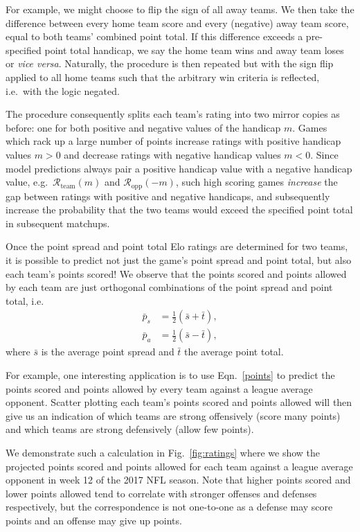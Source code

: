 \documentclass[aps,prc,reprint,amsmath,superscriptaddress,nofootinbib]{revtex4-1}
\begin{document}
For example, we might choose to flip the sign of all away teams.
We then take the difference between every home team score and every (negative) away team score, equal to both teams' combined point total.
If this difference exceeds a pre-specified point total handicap, we say the home team wins and away team loses or \emph{vice versa}.
Naturally, the procedure is then repeated but with the sign flip applied to all home teams such that the arbitrary win criteria is reflected, i.e.\ with the logic negated.

The procedure consequently splits each team's rating into two mirror copies as before: one for both positive and negative values of the handicap $m$.
Games which rack up a large number of points increase ratings with positive handicap values $m > 0$ and decrease ratings with negative handicap values $m < 0$.
Since model predictions always pair a positive handicap value with a negative handicap value, e.g.\ $\mathcal{R}_\text{team}(m)$ and $\mathcal{R}_\text{opp}(-m)$, such high scoring games \emph{increase} the gap between ratings with positive and negative handicaps, and subsequently increase the probability that the two teams would exceed the specified point total in subsequent matchups.

Once the point spread and point total Elo ratings are determined for two teams, it is possible to predict not just the game's point spread and point total, but also each team's points scored!
We observe that the points scored and points allowed by each team are just orthogonal combinations of the point spread and point total, i.e.\
\begin{align}
  \bar{p}_s &= \tfrac{1}{2}(\bar{s} + \bar{t}),\nonumber \\
  \bar{p}_a &= \tfrac{1}{2}(\bar{s} - \bar{t}),
  \label{points}
\end{align}
where $\bar{s}$ is the average point spread and $\bar{t}$ the average point total.

For example, one interesting application is to use Eqn.~\eqref{points} to predict the points scored and points allowed by every team against a league average opponent.
Scatter plotting each team's points scored and points allowed will then give us an indication of which teams are strong offensively (score many points) and which teams are strong defensively (allow few points).

We demonstrate such a calculation in Fig.~\ref{fig:ratings} where we show the projected points scored and points allowed for each team against a league average opponent in week 12 of the 2017 NFL season.
Note that higher points scored and lower points allowed tend to correlate with stronger offenses and defenses respectively, but the correspondence is not one-to-one as a defense may score points and an offense may give up points.
\end{document}

